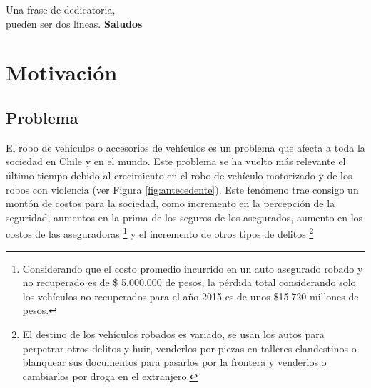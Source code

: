\documentclass[letterpaper,12pt,oneside]{book} %
\begin{document}



\begin{dedicatoria}
	Una frase de dedicatoria, \\
	pueden ser dos líneas. \newp
	\textbf{Saludos}
\end{dedicatoria}

\begin{agradecimientos}
\end{agradecimientos}



\begin{resumen}
\end{resumen}


\hypersetup{
    citecolor=Blue
}

\listoftodos
\chapter{Motivación}



\section{Problema}

El robo de vehículos o accesorios de vehículos es un problema que afecta a toda la sociedad en Chile y en el mundo. Este problema se ha vuelto más relevante el último tiempo debido al crecimiento en el robo de vehículo motorizado y de los robos con violencia (ver Figura \ref{fig:antecedente}). Este fenómeno trae consigo un montón de costos para la sociedad, como incremento en la percepción de la seguridad, aumentos en la prima de los seguros de los asegurados, aumento en los costos de las aseguradoras \footnote{Considerando que el costo promedio incurrido en un auto asegurado robado y no recuperado es de \$ 5.000.000 de pesos, la pérdida total considerando solo los vehículos no recuperados para el año 2015 es de unos \$15.720 millones de pesos.} y el incremento de otros tipos de delitos \footnote{El destino de los vehículos robados es variado, se usan los autos para perpetrar otros delitos y huir, venderlos por piezas en talleres clandestinos o blanquear sus documentos para pasarlos por la frontera y venderlos o cambiarlos por droga en el extranjero.} 
\end{document}
